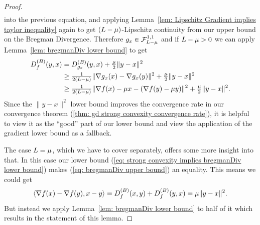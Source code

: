 \begin{proof}
\begin{align}
	\end{align}
	into the previous equation, and applying Lemma~\ref{lem: Lipschitz Gradient
	implies taylor inequality} again to get \((L-\mu)\)-Lipschitz
	continuity from our upper bound on the Bregman Divergence.  Therefore
	\(g_x\in\mathcal{F}^{1,1}_{L-\mu}\) and if \(L -\mu>0\) we
	can apply Lemma~\ref{lem: bregmanDiv lower bound} to get
	\begin{align}
		D^{(B)}_{f}(y,x)
		&= D^{(B)}_{g_x}(y,x) + \tfrac{\mu}2 \|y-x\|^2
		\nonumber \\
		&\ge \tfrac{1}{2(L-\mu)} \|\nabla g_x(x) - \nabla g_x(y)\|^2
		+ \tfrac{\mu}2 \|y-x\|^2 
		\nonumber \\
		\label{eq: improved lower bound strong convex bregman Divergence}
		&\ge \tfrac{1}{2(L-\mu)}
		\|\nabla f(x) - \mu x - (\nabla f(y)-\mu y)\|^2
		+ \tfrac{\mu}2 \|y-x\|^2.
	\end{align}
	Since the \(\|y-x\|^2\) lower bound improves the convergence rate in
	our convergence theorem (\ref{thm: gd strong convexity convergence rate}), it
	is helpful to view it as the ``good'' part of our lower bound and view the
	application of the gradient lower bound as a fallback.

	The case \(L=\mu\), which we have to cover separately, offers some
	more insight into that. In this case our lower bound  (\ref{eq:
	strong convexity implies bregmanDiv lower bound}) makes (\ref{eq: bregmanDiv
	upper bound}) an equality. This means we could get
	\begin{align*}
		\langle \nabla f(x) - \nabla f(y), x-y\rangle
		= D^{(B)}_{f}(x,y) + D^{(B)}_{f}(y,x) = \mu \|y-x\|^2.
	\end{align*}
	But instead we apply Lemma~\ref{lem: bregmanDiv lower bound} to half of it
	which results in the statement of this lemma.


\end{proof}
